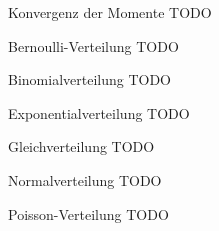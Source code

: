 \begin{theo}{Konvergenz der Momente}
    TODO
\end{theo}

\begin{example}{Bernoulli-Verteilung}
    TODO
\end{example}

\begin{example}{Binomialverteilung}
    TODO
\end{example}

\begin{example}{Exponentialverteilung}
    TODO
\end{example}

\begin{example}{Gleichverteilung}
    TODO
\end{example}

\begin{example}{Normalverteilung}
    TODO
\end{example}

\begin{example}{Poisson-Verteilung}
    TODO
\end{example}